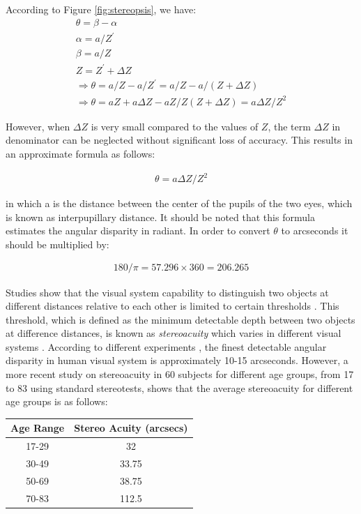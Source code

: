 According to Figure \ref{fig:stereopsis}, we have:
\begin{align}
\theta = \beta - \alpha\\
\alpha = a/Z^{'}\\
\beta = a/Z\\
Z = Z^{'} + \Delta Z\\
\Rightarrow \theta = a/Z - a/Z^{'} = a/Z - a/(Z+\Delta Z) \\
\Rightarrow \theta = aZ+a\Delta Z-aZ/Z(Z+\Delta Z) = a\Delta Z/Z^{2} 
\end{align}

However, when $\Delta Z$ is very small compared to the values of $Z$, the term $\Delta Z$ in denominator can be neglected without significant loss of accuracy. This results in
an approximate formula as follows:

\begin{align}
\label{eq:stac}
\theta = a \Delta Z/Z^{2}
\end{align}

in which a is the distance between the center of the pupils of the two eyes, which is known as interpupillary distance.
It should be noted that this formula estimates the angular disparity in radiant. In order to convert $\theta$ to arcseconds it should be multiplied by:

\begin{align}
180/\pi = 57.296\times360=206.265
\end{align}

Studies show that the visual system capability to distinguish two objects at different distances relative to each other is limited to certain thresholds \cite{binr83,how95}.
This threshold, which is defined as the minimum detectable depth between two 
objects at difference distances, is known as {\it stereoacuity} which varies in different visual systems \cite{binr83,how95}. According to different
experiments \cite{binr83}, the finest detectable angular disparity in human visual system is approximately 10-15 arcseconds. However, a more recent study on
stereoacuity in 60 subjects \cite{garn06} for different age groups, from 17 to 83 using standard stereotests, 
shows that the average stereoacuity for different age groups is as follows:

\begin{minipage}{\linewidth}
\begin{center}
\label{tab:stAcAge}
\begin{tabular}{ |c|c| }
\hline
\textbf{Age Range} & \textbf{Stereo Acuity (arcsecs)} \\ \hline
17-29 & 32 \\  \hline
30-49 & 33.75 \\ \hline
50-69 & 38.75 \\ \hline
70-83 & 112.5 \\ \hline
\end{tabular}
\end{center}
\end{minipage} \newline \newline

